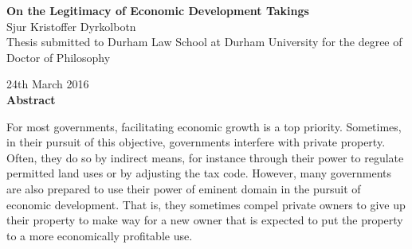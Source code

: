 
\cleardoublepage
{}

\begin{quoting}
  \singlespace
    \begin{center}
  {\LARGE \bfseries On the Legitimacy of Economic Development Takings }\\
  \vspace*{0.5cm}
      {\large Sjur Kristoffer Dyrkolbotn}\\
  \vspace*{0.2cm}  
    {\normalsize Thesis submitted to Durham Law School at Durham University for the degree of Doctor of Philosophy}

  \vspace*{0.2cm}  
    {\normalsize 24th March 2016}\\
  \vspace*{0.5cm}  
    {\normalsize \bfseries Abstract}      
  \end{center}
  {\parindent0pt
For most governments, facilitating economic growth is a top priority. Sometimes, in their pursuit of this objective, governments interfere with private property. Often, they do so by indirect means, for instance through their power to regulate permitted land uses or by adjusting the tax code. However, many governments are also prepared to use their power of eminent domain in the pursuit of economic development. That is, they sometimes compel private owners to give up their property to make way for a new owner that is expected to put the property to a more economically profitable use. %
}
\vspace{0.7mm}


\end{quoting}
